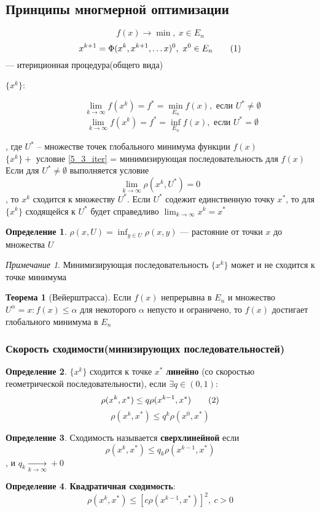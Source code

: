 \documentclass[english]{article}
\newcommand\addtag{\refstepcounter{equation}\tag{\theequation}}
\theoremstyle{plain}
\theoremstyle{remark}
\newtheorem*{remark}{Примечание}
\theoremstyle{definition}
\newtheorem{theorem}{Теорема}[section]
\newtheorem*{definition}{Определение}
\begin{document}
\subsection{Принципы многмерной оптимизации}
\label{sec:orgcedb79d}
\[ f(x) \to \min,\ x \in E_n \]
\[ x^{k + 1} = \Phi(x^k, x^{k + 1}, \dots x)^0,\ x^0 \in E_n \addtag\label{5_3_iter} \]
--- итериционная процедура(общего вида)
\begin{description}
\item[{\(\{x^k\}\):}] \[ \lim_{k \to \infty} f(x^k) = f^* = \min_{E_n} f(x), \text{ если } U^* \neq \emptyset \]
\[ \lim_{k \to \infty} f(x^k) = f^* = \inf_{E_n} f(x), \text{ если } U^* = \emptyset \]
\end{description}
, где \(U^*\) -- множестве точек глобального минимума функции \(f(x)\) \\
\(\{x^k\} +\) условие \ref{5_3_iter} = минимизирующая последовательность для \(f(x)\) \\
Если для \(U^* \neq \emptyset\) выполняется условие
\[ \lim_{k \to \infty} \rho(x^k, U^*) = 0 \], то \(x^k\) сходится к множеству \(U^*\). Если \(U^*\) содежит единственную точку \(x^*\), то для \(\{x^k\}\) сходящейся к \(U^*\) будет справедливо \(\lim_{k \to \infty} x^k = x^*\)
\begin{definition}
\(\rho(x, U) = \inf_{y \in U}\rho(x, y)\) --- растояние от точки \(x\) до множества \(U\)
\end{definition}
\begin{remark}
Минимизирующая последовательность \(\{x^k\}\) может и не сходится к точке минимума
\end{remark}
\begin{theorem}[Вейерштрасса]
Если \(f(x)\) непрерывна в \(E_n\) и множество \(U^\alpha = {x: f(x) \le \alpha}\) для некоторого \(\alpha\) непусто и ограничено, то \(f(x)\) достигает глобального минимума в \(E_n\)
\end{theorem}
\subsubsection{Скорость сходимости(минизирующих последовательностей)}
\label{sec:orgac729ca}
\begin{definition}
\(\{x^k\}\) сходится к точке \(x^*\) \textbf{линейно} (со скоростью геометрической последовательности), если \(\exists q \in (0, 1):\)
\[ \rho(x^k, x^*) \le q \rho(x^{k - 1}, x^*) \addtag\label{5_5_linear}\]
\[ \rho(x^k, x^*) \le q^k \rho(x^0, x^*) \]
\end{definition}
\begin{definition}
Сходимость называется \textbf{сверхлинейной} если
\[ \rho(x^k, x^*) \le q_k \rho(x^{k - 1}, x^*) \], и \(q_k \xrightarrow[k \to \infty]{} +0\)
\end{definition}
\begin{definition}
\textbf{Квадратичная сходимость}:
\[ \rho(x^k, x^*) \le \left[ c \rho(x^{k - 1}, x^*)\right]^2,\ c > 0 \]
\end{definition}
\end{document}

